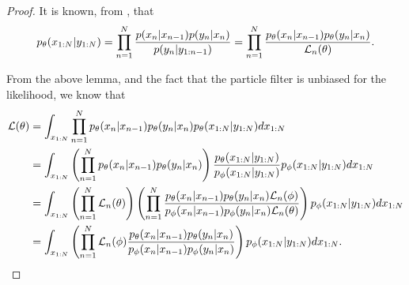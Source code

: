 \documentclass{article}
\begin{document}
\begin{proof}
    It is known, from \cite{doucet2009tutorial}, that 
    $$p_\theta(x_{1:N}|y_{1:N}) = \prod_{n=1}^N \frac{p(x_n|x_{n-1})p(y_n|x_n)}{p(y_n|y_{1:n-1})} = \prod_{n=1}^N \frac{p_\theta(x_n|x_{n-1})p_\theta(y_n|x_n)}{\mathcal{L}_n(\theta)}.$$

    From the above lemma, and the fact that the particle filter is unbiased for the likelihood, we know that
    \begin{align*}
        \mathcal{L}(\theta)
        &= \int_{x_{1:N}} \prod_{n=1}^N p_\theta(x_n|x_{n-1})p_\theta(y_n|x_n) p_\theta(x_{1:N}|y_{1:N}) dx_{1:N} \\
        &= \int_{x_{1:N}} \left(\prod_{n=1}^N  p_\theta(x_n|x_{n-1})p_\theta(y_n|x_n) \right) \frac{p_\theta(x_{1:N}|y_{1:N})}{p_\phi(x_{1:N}|y_{1:N})}p_\phi(x_{1:N}|y_{1:N}) dx_{1:N}\\
        &= \int_{x_{1:N}} \left(\prod_{n=1}^N \mathcal{L}_n(\theta) \right) \left(\prod_{n=1}^N \frac{p_\theta(x_n|x_{n-1})p_\theta(y_n|x_n) \mathcal{L}_n(\phi)}{p_\phi(x_n|x_{n-1})p_\phi(y_n|x_n) \mathcal{L}_n(\theta)}\right)p_\phi(x_{1:N}|y_{1:N}) dx_{1:N} \\ 
        &= \int_{x_{1:N}} \left(\prod_{n=1}^N \mathcal{L}_n(\phi) \frac{p_\theta(x_n|x_{n-1})p_\theta(y_n|x_n)}{p_\phi(x_n|x_{n-1})p_\phi(y_n|x_n) }\right)p_\phi(x_{1:N}|y_{1:N}) dx_{1:N}.
    \end{align*}


\end{proof}
\end{document}
